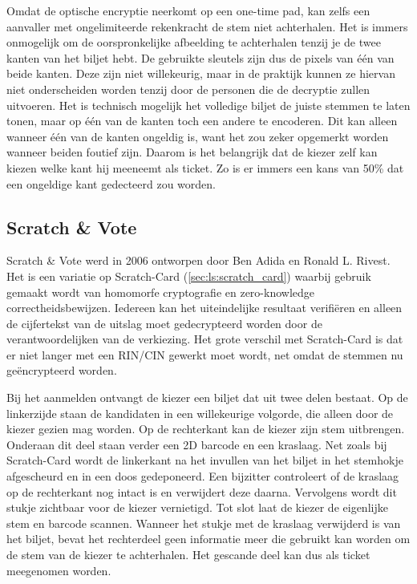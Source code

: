 \npar Omdat de optische encryptie neerkomt op een one-time pad, kan zelfs een aanvaller met ongelimiteerde rekenkracht de stem niet achterhalen. Het is immers onmogelijk om de oorspronkelijke afbeelding te achterhalen tenzij je de twee kanten van het biljet hebt. De gebruikte sleutels zijn dus de pixels van één van beide kanten. Deze zijn niet willekeurig, maar in de praktijk kunnen ze hiervan niet onderscheiden worden tenzij door de personen die de decryptie zullen uitvoeren. Het is technisch mogelijk het volledige biljet de juiste stemmen te laten tonen, maar op \'e\'en van de kanten toch een andere te encoderen. Dit kan alleen wanneer \'e\'en van de kanten ongeldig is, want het zou zeker opgemerkt worden wanneer beiden foutief zijn. Daarom is het belangrijk dat de kiezer zelf kan kiezen welke kant hij meeneemt als ticket. Zo is er immers een kans van 50\% dat een ongeldige kant gedecteerd zou worden.

\subsection{Scratch \& Vote}
\label{sec:ls:scratch_and_vote}

Scratch \& Vote\cite{adida_rivest_scratch_and_vote} werd in 2006 ontworpen door Ben Adida en Ronald L. Rivest. Het is een variatie op Scratch-Card (\ref{sec:ls:scratch_card}) waarbij gebruik gemaakt wordt van homomorfe cryptografie en zero-knowledge correctheidsbewijzen. Iedereen kan het uiteindelijke resultaat verifi\"eren en alleen de cijfertekst van de uitslag moet gedecrypteerd worden door de verantwoordelijken van de verkiezing. Het grote verschil met Scratch-Card is dat er niet langer met een RIN/CIN gewerkt moet wordt, net omdat de stemmen nu ge\"encrypteerd worden.

\npar Bij het aanmelden ontvangt de kiezer een biljet dat uit twee delen bestaat. Op de linkerzijde staan de kandidaten in een willekeurige volgorde, die alleen door de kiezer gezien mag worden. Op de rechterkant kan de kiezer zijn stem uitbrengen. Onderaan dit deel staan verder een 2D barcode en een kraslaag. Net zoals bij Scratch-Card wordt de linkerkant na het invullen van het biljet in het stemhokje afgescheurd en in een doos gedeponeerd. Een bijzitter controleert of de kraslaag op de rechterkant nog intact is en verwijdert deze daarna. Vervolgens wordt dit stukje zichtbaar voor de kiezer vernietigd. Tot slot laat de kiezer de eigenlijke stem en barcode scannen. Wanneer het stukje met de kraslaag verwijderd is van het biljet, bevat het rechterdeel geen informatie meer die gebruikt kan worden om de stem van de kiezer te achterhalen. Het gescande deel kan dus als ticket meegenomen worden.

